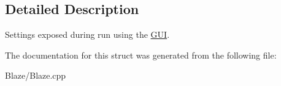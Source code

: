 \subsection{Detailed Description}
Settings exposed during run using the \hyperlink{classblaze_1_1GUI}{G\+UI}. 

The documentation for this struct was generated from the following file\+:\begin{DoxyCompactItemize}
\item 
Blaze/Blaze.\+cpp\end{DoxyCompactItemize}

